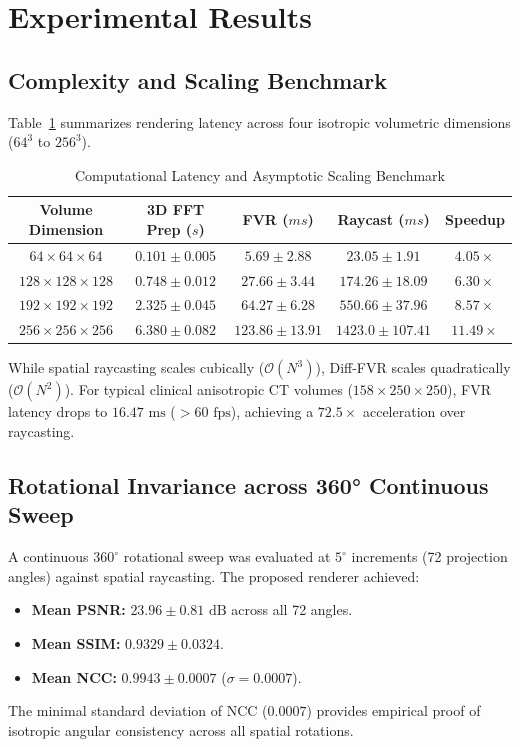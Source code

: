 \documentclass[journal,twocolumn]{IEEEtran}
\begin{document}
\section{Experimental Results}

\subsection{Complexity and Scaling Benchmark}
Table~\ref{tab:complexity} summarizes rendering latency across four isotropic volumetric dimensions ($64^3$ to $256^3$).

\begin{table}[htbp]
\caption{Computational Latency and Asymptotic Scaling Benchmark}
\label{tab:complexity}
\centering
\begin{tabular}{ccccc}
\toprule
Volume Dimension & 3D FFT Prep ($s$) & FVR ($ms$) & Raycast ($ms$) & Speedup \\
\midrule
$64 \times 64 \times 64$   & $0.101 \pm 0.005$ & $5.69 \pm 2.88$   & $23.05 \pm 1.91$    & $\mathbf{4.05\times}$ \\
$128 \times 128 \times 128$ & $0.748 \pm 0.012$ & $27.66 \pm 3.44$  & $174.26 \pm 18.09$  & $\mathbf{6.30\times}$ \\
$192 \times 192 \times 192$ & $2.325 \pm 0.045$ & $64.27 \pm 6.28$  & $550.66 \pm 37.96$  & $\mathbf{8.57\times}$ \\
$256 \times 256 \times 256$ & $6.380 \pm 0.082$ & $123.86 \pm 13.91$& $1423.0 \pm 107.41$ & $\mathbf{11.49\times}$ \\
\bottomrule
\end{tabular}
\end{table}

While spatial raycasting scales cubically ($\mathcal{O}(N^3)$), Diff-FVR scales quadratically ($\mathcal{O}(N^2)$). For typical clinical anisotropic CT volumes ($158 \times 250 \times 250$), FVR latency drops to $16.47\text{ ms}$ ($> 60\text{ fps}$), achieving a $\mathbf{72.5\times}$ acceleration over raycasting.

\subsection{Rotational Invariance across 360° Continuous Sweep}
A continuous $360^\circ$ rotational sweep was evaluated at $5^\circ$ increments (72 projection angles) against spatial raycasting. The proposed renderer achieved:
\begin{itemize}
    \item \textbf{Mean PSNR:} $23.96 \pm 0.81\text{ dB}$ across all 72 angles.
    \item \textbf{Mean SSIM:} $0.9329 \pm 0.0324$.
    \item \textbf{Mean NCC:} $0.9943 \pm 0.0007$ ($\sigma = 0.0007$).
\end{itemize}
The minimal standard deviation of NCC ($0.0007$) provides empirical proof of isotropic angular consistency across all spatial rotations.
\end{document}
